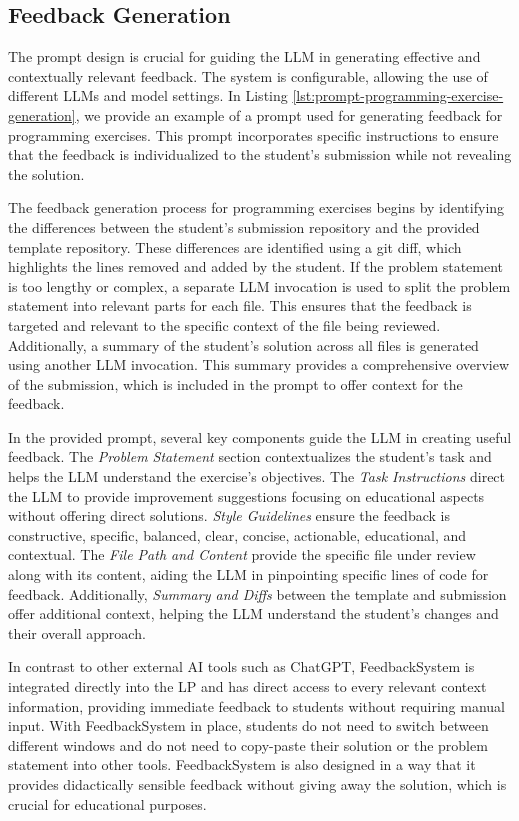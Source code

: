 \documentclass[sigconf,screen,review,anonymous]{acmart}
\begin{document}
\subsection{Feedback Generation}

The prompt design is crucial for guiding the LLM in generating effective and contextually relevant feedback.
The system is configurable, allowing the use of different LLMs and model settings. 
In Listing \ref{lst:prompt-programming-exercise-generation}, we provide an example of a prompt used for generating feedback for programming exercises. 
This prompt incorporates specific instructions to ensure that the feedback is individualized to the student's submission while not revealing the solution.

The feedback generation process for programming exercises begins by identifying the differences between the student's submission repository and the provided template repository. 
These differences are identified using a git diff, which highlights the lines removed and added by the student. 
If the problem statement is too lengthy or complex, a separate LLM invocation is used to split the problem statement into relevant parts for each file. 
This ensures that the feedback is targeted and relevant to the specific context of the file being reviewed. 
Additionally, a summary of the student's solution across all files is generated using another LLM invocation. 
This summary provides a comprehensive overview of the submission, which is included in the prompt to offer context for the feedback.

In the provided prompt, several key components guide the LLM in creating useful feedback. The \textit{Problem Statement} section contextualizes the student's task and helps the LLM understand the exercise's objectives.
The \textit{Task Instructions} direct the LLM to provide improvement suggestions focusing on educational aspects without offering direct solutions.
\textit{Style Guidelines} ensure the feedback is constructive, specific, balanced, clear, concise, actionable, educational, and contextual.
The \textit{File Path and Content} provide the specific file under review along with its content, aiding the LLM in pinpointing specific lines of code for feedback.
Additionally, \textit{Summary and Diffs} between the template and submission offer additional context, helping the LLM understand the student's changes and their overall approach.

In contrast to other external AI tools such as ChatGPT, FeedbackSystem is integrated directly into the LP and has direct access to every relevant context information, providing immediate feedback to students without requiring manual input.
With FeedbackSystem in place, students do not need to switch between different windows and do not need to copy-paste their solution or the problem statement into other tools. 
FeedbackSystem is also designed in a way that it provides didactically sensible feedback without giving away the solution, which is crucial for educational purposes.
\end{document}
